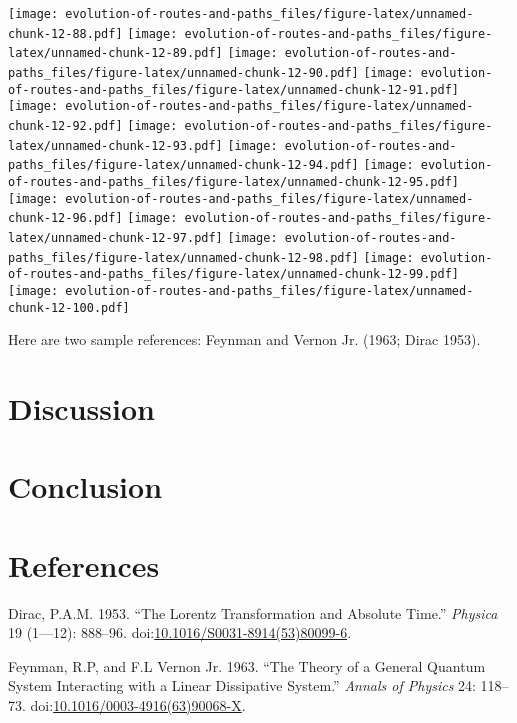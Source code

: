 \documentclass[]{elsarticle} %
\makeatletter
\def\maxwidth{\ifdim\Gin@nat@width>\linewidth\linewidth
\else\Gin@nat@width\fi}
\let\Oldincludegraphics\includegraphics
\renewcommand{\includegraphics}[1]{\Oldincludegraphics[width=\maxwidth]{#1}}
\makeatother
\begin{document}
\texttt{[image: evolution-of-routes-and-paths\_files/figure-latex/unnamed-chunk-12-88.pdf]}
\texttt{[image: evolution-of-routes-and-paths\_files/figure-latex/unnamed-chunk-12-89.pdf]}
\texttt{[image: evolution-of-routes-and-paths\_files/figure-latex/unnamed-chunk-12-90.pdf]}
\texttt{[image: evolution-of-routes-and-paths\_files/figure-latex/unnamed-chunk-12-91.pdf]}
\texttt{[image: evolution-of-routes-and-paths\_files/figure-latex/unnamed-chunk-12-92.pdf]}
\texttt{[image: evolution-of-routes-and-paths\_files/figure-latex/unnamed-chunk-12-93.pdf]}
\texttt{[image: evolution-of-routes-and-paths\_files/figure-latex/unnamed-chunk-12-94.pdf]}
\texttt{[image: evolution-of-routes-and-paths\_files/figure-latex/unnamed-chunk-12-95.pdf]}
\texttt{[image: evolution-of-routes-and-paths\_files/figure-latex/unnamed-chunk-12-96.pdf]}
\texttt{[image: evolution-of-routes-and-paths\_files/figure-latex/unnamed-chunk-12-97.pdf]}
\texttt{[image: evolution-of-routes-and-paths\_files/figure-latex/unnamed-chunk-12-98.pdf]}
\texttt{[image: evolution-of-routes-and-paths\_files/figure-latex/unnamed-chunk-12-99.pdf]}
\texttt{[image: evolution-of-routes-and-paths\_files/figure-latex/unnamed-chunk-12-100.pdf]}

Here are two sample references: Feynman and Vernon Jr. (1963; Dirac
1953).

\section{Discussion}\label{discussion}

\section{Conclusion}\label{conclusion}

\section*{References}\label{references}

\hypertarget{refs}{}
\hypertarget{ref-Dirac1953888}{}
Dirac, P.A.M. 1953. ``The Lorentz Transformation and Absolute Time.''
\emph{Physica} 19 (1---12): 888--96.
doi:\href{https://doi.org/10.1016/S0031-8914(53)80099-6}{10.1016/S0031-8914(53)80099-6}.

\hypertarget{ref-Feynman1963118}{}
Feynman, R.P, and F.L Vernon Jr. 1963. ``The Theory of a General Quantum
System Interacting with a Linear Dissipative System.'' \emph{Annals of
Physics} 24: 118--73.
doi:\href{https://doi.org/10.1016/0003-4916(63)90068-X}{10.1016/0003-4916(63)90068-X}.
\end{document}
